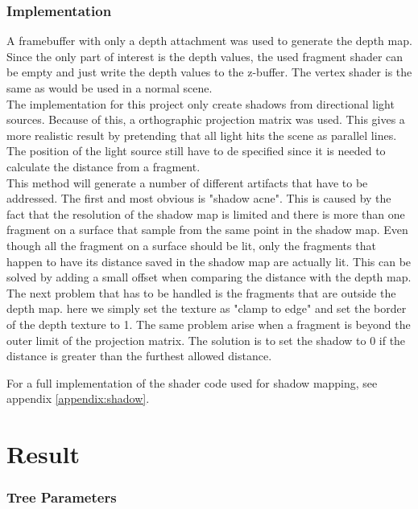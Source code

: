 \documentclass{article}
\begin{document}
  			\subsubsection*{Implementation}
  				
  				A framebuffer with only a depth attachment was used to generate the depth map. Since the only part of interest is the depth values, the used fragment shader can be empty and just write the depth values to the z-buffer. The vertex shader is the same as would be used in a normal scene. \\
  				
  				The implementation for this project only create shadows from directional light sources. Because of this, a orthographic projection matrix was used. This gives a more realistic result by pretending that all light hits the scene as parallel lines. The position of the light source still have to de specified since it is needed to calculate the distance from a fragment. \\
  				
  				This method will generate a number of different artifacts that have to be addressed. The first and most obvious is "shadow acne". This is caused by the fact that the resolution of the shadow map is limited and there is more than one fragment on a surface that sample from the same point in the shadow map. Even though all the fragment on a surface should be lit, only the fragments that happen to have its distance saved in the shadow map are actually lit. This can be solved by adding a small offset when comparing the distance with the depth map. \\
  				
  				The next problem that has to be handled is the fragments that are outside the depth map. here we simply set the texture as "clamp to edge" and set the border of the depth texture to 1. The same problem arise when a fragment is beyond the outer limit of the projection matrix. The solution is to set the shadow to 0 if the distance is greater than the furthest allowed distance.
  				
  				For a full implementation of the shader code used for shadow mapping, see appendix \ref{appendix:shadow}.
  				
  	\section{Result}
  	
  		\subsubsection*{Tree Parameters}
  		
\end{document}
